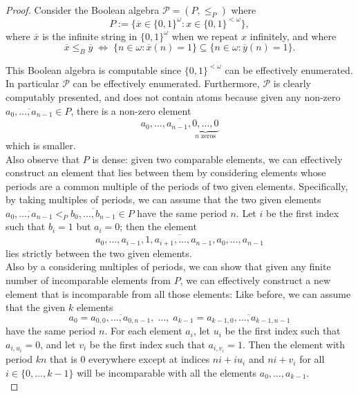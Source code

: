 \documentclass{article}
\begin{document}
  \begin{proof}
    Consider the Boolean algebra $\mathcal{P}=(P,\leq_P)$ where
    \[P:= \{\overline{x}\in \{0,1\}^\omega: x\in \{0,1\}^{<\omega}\},\]
    where $\overline{x}$ is the infinite string in $\{0,1\}^\omega$ when we
    repeat $x$ infinitely, and where
    \[\overline{x} \leq_B\overline{y}\; \Leftrightarrow\; \{n\in\omega:
    \overline{x}(n)=1\} \subseteq \{n\in\omega: \overline{y}(n)=1\}.\]

    This Boolean algebra is computable since $\{0,1\}^{<\omega}$ can be
    effectively enumerated. In particular $\mathcal{P}$ can be effectively
    enumerated. Furthermore, $\mathcal{P}$ is clearly computably presented,
    and does not contain atoms because given any non-zero
    $\overline{a_0,\ldots,a_{n-1}}\in P$, there is a non-zero element
    \[\overline{a_0,\ldots,a_{n-1},\underbrace{0,\ldots,0}_{n\;
    \text{zeros}}}\]
    which is smaller. \\

    Also observe that $P$ is dense: given two comparable
    elements, we can effectively construct an element that lies between
    them by considering elements whose periods are a common multiple of the
    periods of two given elements. Specifically, by taking multiples of
    periods, we can assume that the two given elements
    $\overline{a_0,\ldots,a_{n-1}} <_P\overline{b_0,\ldots,b_{n-1}}\in P$
    have the same period $n$. Let $i$ be the first index such that $b_i=1$
    but $a_i=0$; then the element
    \[\overline{a_0,\ldots,a_{i-1},1,a_{i+1},\ldots,a_{n-1},
    a_0,\ldots,a_{n-1}}\]
    lies strictly between the two given elements. \\

    Also by a considering multiples of periods, we can show
    that given any finite number of incomparable elements from $P$, we can
    effectively construct a new element that is incomparable from all those
    elements: Like before, we can assume that the given $k$ elements
    \[a_0=\overline{a_{0,0},\ldots,a_{0,n-1}},\; \ldots,\;
    a_{k-1}=\overline{a_{k-1,0},\ldots,a_{k-1,n-1}}\]
    have the same period $n$. For each element $a_i$, let $u_i$ be the
    first index such that $a_{i,u_i}=0$, and let $v_i$ be the
    first index such that $a_{i,v_i}=1$. Then the element with period $kn$
    that is 0 everywhere except at indices $ni+iu_i$ and $ni+v_i$ for all
    $i\in\{0,\ldots,k-1\}$ will be incomparable with all the elements
    $a_0,\ldots,a_{k-1}$. \\


\end{proof}
\end{document}

